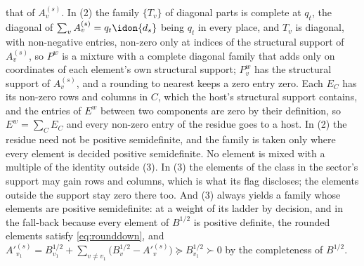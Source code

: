 \begin{definition}
that of $A^{(s)}_v$. In (2) the family $\{T_v\}$ of diagonal parts is
complete at $q_t$, the diagonal of $\sum_vA^{(s)}_v=q_t\idon{d_s}$ being
$q_t$ in every place, and $T_v$ is diagonal, with non-negative entries,
non-zero only at indices of the structural support of $A^{(s)}_v$, so
$P^{w}$ is a mixture with a complete diagonal family that adds only on
coordinates of each element's own structural support; $P^{w}_v$ has the
structural support of $A^{(s)}_v$, and a rounding to nearest keeps a zero
entry zero. Each $E_C$ has its non-zero rows and columns in $C$, which the
host's structural support contains, and the entries of $E^{w}$ between two
components are zero by their definition, so $E^{w}=\sum_CE_C$ and every
non-zero entry of the residue goes to a host. In (2) the residue need not be
positive semidefinite, and the family is taken only where every element is
decided positive semidefinite. No element is mixed with a multiple of the
identity outside (3). In (3) the elements of the class in the sector's
support may gain rows and columns, which is what its flag discloses; the
elements outside the support stay zero there too. And (3) always yields a
family whose elements are positive semidefinite: at a weight of its ladder by decision, and
in the fall-back because every element of $B^{1/2}$ is positive definite, the
rounded elements satisfy \eqref{eq:rounddown}, and
$A'^{(s)}_{v_1}=B^{1/2}_{v_1}+\sum_{v\ne v_1}\big(B^{1/2}_v-A'^{(s)}_v\big)
\succeq B^{1/2}_{v_1}\succ0$ by the completeness of $B^{1/2}$.
\end{definition}
